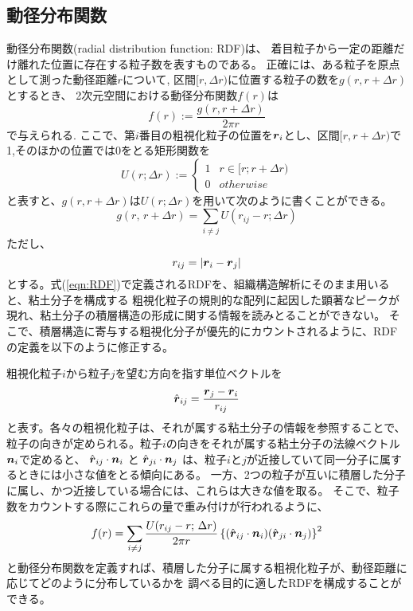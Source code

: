 \subsection{動径分布関数}
動径分布関数(radial distribution function: RDF)は、
着目粒子から一定の距離だけ離れた位置に存在する粒子数を表すものである。
正確には、ある粒子を原点として測った動径距離$r$について,
区間$[r,\Delta r)$に位置する粒子の数を$g(r,r+\Delta r)$とするとき、
2次元空間における動径分布関数$f(r)$は
\begin{equation}
	f(r):=\frac{g(r,r+\Delta r)}{2\pi r}
	\label{eqn:RDF}
\end{equation}
で与えられる.
ここで、第$i$番目の粗視化粒子の位置を$\mbox{\boldmath $r$}_i$とし、区間$[r,r+\Delta r)$で
1,そのほかの位置では0をとる矩形関数を
\begin{equation}
	U(r;\Delta r):=\left\{
		\begin{array}{cc}
			1 &  r \in [r;r+\Delta r)\\
			0 &  otherwise
		\end{array}
	\right.
	\label{eqn:}
\end{equation}
と表すと、$g(r,r+\Delta r)$は$U(r;\Delta r)$を用いて次のように書くことができる。
\begin{equation}
	g(r,\,r+\Delta r)=\sum_{i\neq j} U(r_{ij}-r;\Delta r)
	\label{eqn:gr}
\end{equation}
ただし、
\begin{equation}
	r_{ij}=\left|\mbox{\boldmath $r$}_i-\mbox{\boldmath $r$}_j\right|
	\label{eqn:rij}
\end{equation}
とする。式(\ref{eqn:RDF})で定義されるRDFを、組織構造解析にそのまま用いると、粘土分子を構成する
粗視化粒子の規則的な配列に起因した顕著なピークが現れ、粘土分子の積層構造の形成に関する情報を読みとることができない。
そこで、積層構造に寄与する粗視化分子が優先的にカウントされるように、RDFの定義を以下のように修正する。

粗視化粒子$i$から粒子$j$を望む方向を指す単位ベクトルを
\begin{equation}
	\hat{\mbox{\boldmath $r$}}_{ij}=\frac{\mbox{\boldmath $r$}_j-\mbox{\boldmath $r$}_i}{r_{ij}}
	\label{eqn:rhat}
\end{equation}
と表す。各々の粗視化粒子は、それが属する粘土分子の情報を参照することで、
粒子の向きが定められる。粒子$i$の向きをそれが属する粘土分子の法線ベクトル$\mbox{\boldmath $n$}_i$で定めると、
$\hat{\mbox{\boldmath $r$}}_{ij}\cdot\mbox{\boldmath $n$}_i$
と
$\hat{\mbox{\boldmath $r$}}_{ji}\cdot\mbox{\boldmath $n$}_j$
は、粒子$i$と$j$が近接していて同一分子に属するときには小さな値をとる傾向にある。
一方、2つの粒子が互いに積層した分子に属し、かつ近接している場合には、これらは大きな値を取る。
そこで、粒子数をカウントする際にこれらの量で重み付けが行われるように、
\begin{equation}
	f(r)=
	\sum_{i\neq j} \frac{U(r_{ij}-r;\, \Delta r)}{2\pi r}
	\left\{
		(\hat{\mbox{\boldmath $r$}}_{ij} \cdot \mbox{\boldmath $n$}_i)
		(\hat{\mbox{\boldmath $r$}}_{ji} \cdot \mbox{\boldmath $n$}_j)
	\right\}^2
	\label{eqn:RDFn}
\end{equation}
と動径分布関数を定義すれば、積層した分子に属する粗視化粒子が、動径距離に応じてどのように分布しているかを
調べる目的に適したRDFを構成することができる。
